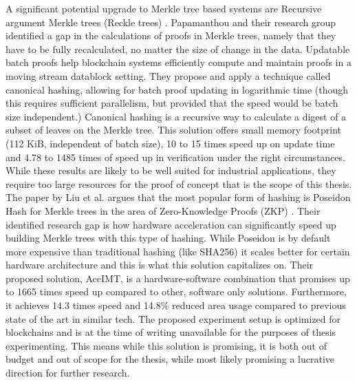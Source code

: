 \documentclass[a4paper,11pt]{report} %
\theoremstyle{change}
\theoremstyle{theoremstyle}
\begin{document}
A significant potential upgrade to Merkle tree based systems are Recursive argument Merkle trees (Reckle trees) \cite{papamanthou2024reckle}. Papamanthou and their research group identified a gap in the calculations of proofs in Merkle trees, namely that they have to be fully recalculated, no matter the size of change in the data. Updatable batch proofs help blockchain systems efficiently compute and maintain proofs in a moving stream datablock setting. They propose and apply a technique called canonical hashing, allowing for batch proof updating in logarithmic time (though this requires sufficient parallelism, but provided that the speed would be batch size independent.) Canonical hashing is a recursive way to calculate a digest of a subset of leaves on the Merkle tree. This solution offers small memory footprint (112 KiB, independent of batch size), 10 to 15 times speed up on update time and 4.78 to 1485 times of speed up in verification under the right circumstances. While these results are likely to be well suited for industrial applications, they require too large resources for the proof of concept that is the scope of this thesis.\\
The paper by Liu et al. argues that the most popular form of hashing is Poseidon Hash for Merkle trees in the area of Zero-Knowledge Proofs (ZKP) \cite{liu2025acclmt}. Their identified research gap is how hardware acceleration can significantly speed up building Merkle trees with this type of hashing. While Poseidon is by default more expensive than traditional hashing (like SHA256) it scales better for certain hardware architecture and this is what this solution capitalizes on. Their proposed solution, AccIMT,  is a hardware-software combination that promises up to 1665 times speed up compared to other, software only solutions. Furthermore, it achieves 14.3 times speed and 14.8\% reduced area usage compared to previous state of the art in similar tech. The proposed experiment setup is optimized for blockchains and is at the time of writing unavailable for the purposes of thesis experimenting. This means while this solution is promising, it is both out of budget and out of scope for the thesis, while most likely promising a lucrative direction for further research.\\
\end{document}
